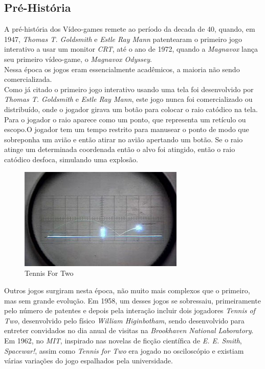 \documentclass[paper=a4, fontsize=11pt]{scrartcl}	%
\numberwithin{equation}{section}															%
\numberwithin{figure}{section}																%
\numberwithin{table}{section}																%
\begin{document}
\subsection{Pré-História}
A pré-história dos Vídeo-games remete ao período da decada de 40, quando, em 1947, \textit{Thomas T. Goldsmith }e \textit{Estle Ray Mann }patentearam o primeiro jogo interativo a usar um monitor \textit{CRT}, até o ano de 1972, quando a \textit{Magnavox }lança seu primeiro vídeo-game, o \textit{Magnavox Odyssey}.\\
Nessa época os jogos eram essencialmente acadêmicos, a maioria não sendo comercializada.\\
Como já citado o primeiro jogo interativo usando uma tela foi desenvolvido por \textit{Thomas T. Goldsmith} e \textit{Estle Ray Mann}, este jogo nunca foi comercializado ou distribuído, onde o jogador girava um botão para colocar o raio catódico na tela. Para o jogador o raio aparece como um ponto, que representa um retículo ou escopo.O jogador tem um tempo restrito para manusear o ponto de modo que sobreponha um avião e então atirar no avião apertando um botão. Se o raio atinge um determinada coordenada então o alvo foi atingido, então o raio catódico desfoca, simulando uma explosão.\\
\begin{figure}[h!]
	\centering
    \includegraphics[width=0.7\textwidth]{img/tennis-for-two}
    \caption{Tennis For Two}
\end{figure}
Outros jogos surgiram nesta época, não muito mais complexos que o primeiro, mas sem grande evolução. Em 1958, um desses jogos se sobressaiu, primeiramente pelo número de patentes e depois pela interação incluir dois jogadores \textit{Tennis of Two}, desenvolvido pelo físico \textit{William Higinbotham}, sendo desenvolvido para entreter convidados no dia anual de visitas na \textit{Brookhaven National Laboratory}.\\
Em 1962, no \textit{MIT}, inspirado nas novelas de ficção científica de \textit{E. E. Smith}, \textit{Spacewar!}, assim como \textit{Tennis for Two} era jogado no osciloscópio e existiam várias variações do jogo espalhados pela universidade.\\
\end{document}
